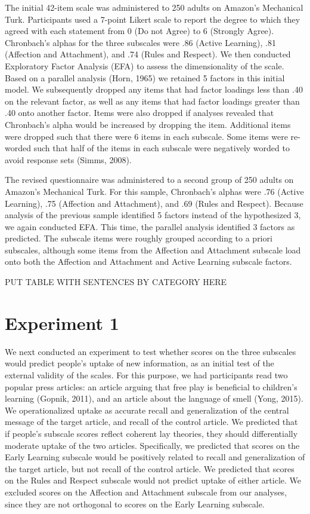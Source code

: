 \documentclass[10pt, letterpaper]{article}
\begin{document}
The initial 42-item scale was administered to 250 adults on Amazon's
Mechanical Turk. Participants used a 7-point Likert scale to report the
degree to which they agreed with each statement from 0 (Do not Agree) to
6 (Strongly Agree). Chronbach's alphas for the three subscales were .86
(Active Learning), .81 (Affection and Attachment), and .74 (Rules and
Respect). We then conducted Exploratory Factor Analysis (EFA) to assess
the dimensionality of the scale. Based on a parallel analysis (Horn,
1965) we retained 5 factors in this initial model. We subsequently
dropped any items that had factor loadings less than .40 on the relevant
factor, as well as any items that had factor loadings greater than .40
onto another factor. Items were also dropped if analyses revealed that
Chronbach's alpha would be increased by dropping the item. Additional
items were dropped such that there were 6 items in each subscale. Some
items were re-worded such that half of the items in each subscale were
negatively worded to avoid response sets (Simms, 2008).

The revised questionnaire was administered to a second group of 250
adults on Amazon's Mechanical Turk. For this sample, Chronbach's alphas
were .76 (Active Learning), .75 (Affection and Attachment), and .69
(Rules and Respect). Because analysis of the previous sample identified
5 factors instead of the hypothesized 3, we again conducted EFA. This
time, the parallel analysis identified 3 factors as predicted. The
subscale items were roughly grouped according to a priori subscales,
although some items from the Affection and Attachment subscale load onto
both the Affection and Attachment and Active Learning subscale factors.

PUT TABLE WITH SENTENCES BY CATEGORY HERE

\section{Experiment 1}\label{experiment-1}

We next conducted an experiment to test whether scores on the three
subscales would predict people's uptake of new information, as an
initial test of the external validity of the scales. For this purpose,
we had participants read two popular press articles: an article arguing
that free play is beneficial to children's learning (Gopnik, 2011), and
an article about the language of smell (Yong, 2015). We operationalized
uptake as accurate recall and generalization of the central message of
the target article, and recall of the control article. We predicted that
if people's subscale scores reflect coherent lay theories, they should
differentially moderate uptake of the two articles. Specifically, we
predicted that scores on the Early Learning subscale would be positively
related to recall and generalization of the target article, but not
recall of the control article. We predicted that scores on the Rules and
Respect subscale would not predict uptake of either article. We excluded
scores on the Affection and Attachment subscale from our analyses, since
they are not orthogonal to scores on the Early Learning subscale.
\end{document}
